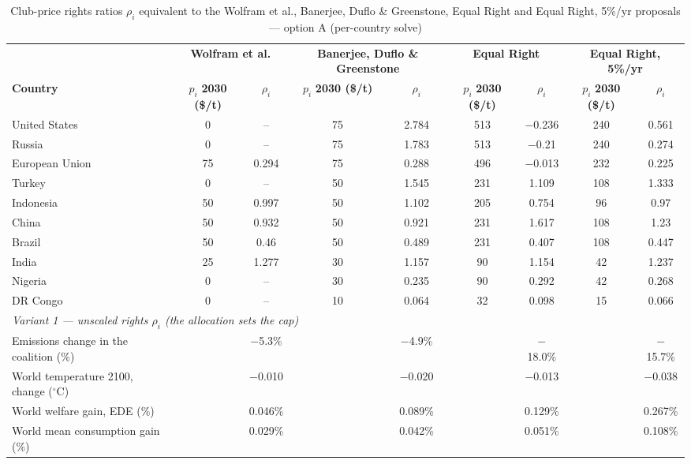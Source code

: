 \begin{table}[htbp]
\centering
\small
\caption{Club-price rights ratios $\rho_i$ equivalent to the Wolfram et al., Banerjee, Duflo \& Greenstone, Equal Right and Equal Right, 5\%/yr proposals --- option A (per-country solve)}
\renewcommand{\arraystretch}{1.15}
\begin{tabular}{lcccccccc}
  \toprule
  & \multicolumn{2}{c}{\textbf{Wolfram et al.}} & \multicolumn{2}{c}{\textbf{Banerjee, Duflo \& Greenstone}} & \multicolumn{2}{c}{\textbf{Equal Right}} & \multicolumn{2}{c}{\textbf{Equal Right, 5\%/yr}} \\
  \cmidrule(lr){2-3} \cmidrule(lr){4-5} \cmidrule(lr){6-7} \cmidrule(lr){8-9}
  \textbf{Country} & $p_i$ \textbf{2030 (\$/t)} & $\rho_i$ & $p_i$ \textbf{2030 (\$/t)} & $\rho_i$ & $p_i$ \textbf{2030 (\$/t)} & $\rho_i$ & $p_i$ \textbf{2030 (\$/t)} & $\rho_i$ \\
  \midrule
  United States & 0 & -- & 75 & 2.784 & 513 & $-$0.236 & 240 & 0.561 \\
  Russia & 0 & -- & 75 & 1.783 & 513 & $-$0.21 & 240 & 0.274 \\
  European Union & 75 & 0.294 & 75 & 0.288 & 496 & $-$0.013 & 232 & 0.225 \\
  Turkey & 0 & -- & 50 & 1.545 & 231 & 1.109 & 108 & 1.333 \\
  Indonesia & 50 & 0.997 & 50 & 1.102 & 205 & 0.754 & 96 & 0.97 \\
  China & 50 & 0.932 & 50 & 0.921 & 231 & 1.617 & 108 & 1.23 \\
  Brazil & 50 & 0.46 & 50 & 0.489 & 231 & 0.407 & 108 & 0.447 \\
  India & 25 & 1.277 & 30 & 1.157 & 90 & 1.154 & 42 & 1.237 \\
  Nigeria & 0 & -- & 30 & 0.235 & 90 & 0.292 & 42 & 0.268 \\
  DR Congo & 0 & -- & 10 & 0.064 & 32 & 0.098 & 15 & 0.066 \\
  \midrule
  \multicolumn{9}{l}{\textit{Variant 1 --- unscaled rights $\rho_i$ (the allocation sets the cap)}} \\
  \quad Emissions change in the coalition (\%) &  & $-$5.3\% &  & $-$4.9\% &  & $-$18.0\% &  & $-$15.7\% \\
  \quad World temperature 2100, change ($^\circ$C) &  & $-$0.010 &  & $-$0.020 &  & $-$0.013 &  & $-$0.038 \\
  \quad World welfare gain, EDE (\%) &  & 0.046\% &  & 0.089\% &  & 0.129\% &  & 0.267\% \\
  \quad World mean consumption gain (\%) &  & 0.029\% &  & 0.042\% &  & 0.051\% &  & 0.108\% \\

\end{tabular}
\end{table}
